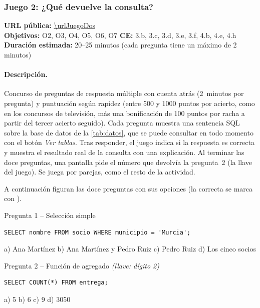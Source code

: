 \documentclass[11pt,a4paper]{article}
\begin{document}
\subsubsection{Juego 2: ¿Qué devuelve la consulta?}
\label{sec:juego2}

\begin{nota}
\textbf{URL pública:} \url{\urlJuegoDos}\\
\textbf{Objetivos:} O2, O3, O4, O5, O6, O7 \quad
\textbf{CE:} 3.b, 3.c, 3.d, 3.e, 3.f, 4.b, 4.e, 4.h \quad
\textbf{Duración estimada:} 20–25 minutos (cada pregunta tiene un máximo de 2 minutos)
\end{nota}

\paragraph{Descripción.} Concurso de preguntas de respuesta múltiple con cuenta atrás
(2~minutos por pregunta) y puntuación según rapidez (entre 500 y 1000 puntos por acierto, como en
los concursos de televisión, más una bonificación de 100 puntos por racha a partir del tercer
acierto seguido). Cada pregunta muestra una sentencia SQL sobre la base de datos de la
\autoref{tab:datos}, que se puede consultar en todo momento con el botón \textit{Ver tablas}. Tras
responder, el juego indica si la respuesta es correcta y muestra el resultado real de la
consulta con una explicación. Al terminar las doce preguntas, una pantalla pide el número
que devolvía la pregunta~2 (la llave del juego). Se juega por parejas, como el resto de la
actividad.

A continuación figuran las doce preguntas con sus opciones (la correcta se marca con
\textbf{\checkmark}).

\newcommand{\ok}{\textbf{\checkmark}}

\begin{reto}{Pregunta 1 -- Selección simple}
\begin{lstlisting}
SELECT nombre FROM socio WHERE municipio = 'Murcia';
\end{lstlisting}
a) Ana Martínez \quad
b) Ana Martínez y Pedro Ruiz \ok \quad
c) Pedro Ruiz \quad
d) Los cinco socios
\end{reto}

\begin{reto}{Pregunta 2 -- Función de agregado \emph{(llave: dígito 2)}}
\begin{lstlisting}
SELECT COUNT(*) FROM entrega;
\end{lstlisting}
a) 5 \quad b) 6 \quad c) 9 \ok \quad d) 3050
\end{reto}
\end{document}
